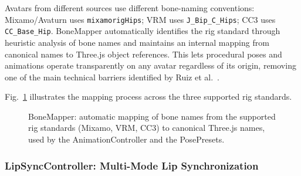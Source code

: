 \documentclass[conference]{IEEEtran}
\begin{document}
Avatars from different sources use different bone-naming conventions:
Mixamo/Avaturn uses \texttt{mixamorigHips}; VRM uses \texttt{J\_Bip\_C\_Hips};
CC3 uses \texttt{CC\_Base\_Hip}. BoneMapper automatically identifies the rig
standard through heuristic analysis of bone names and maintains an internal
mapping from canonical names to Three.js object references. This lets
procedural poses and animations operate transparently on any avatar
regardless of its origin, removing one of the main technical barriers
identified by Ruiz et al.~\cite{ruiz2020}.

Fig.~\ref{fig:bonemapper} illustrates the mapping process across the three
supported rig standards.

\begin{figure}[htbp]
  \centering
  \caption{BoneMapper: automatic mapping of bone names from the supported rig
    standards (Mixamo, VRM, CC3) to canonical Three.js names, used by the
    AnimationController and the PosePresets.}
  \label{fig:bonemapper}
\end{figure}

\subsubsection{LipSyncController: Multi-Mode Lip Synchronization}
\end{document}
